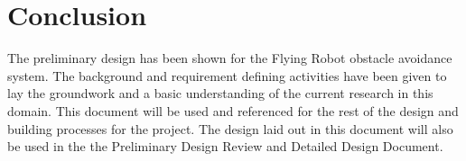 \documentclass{article}
\begin{document}
\section{Conclusion}
The preliminary design has been shown for the Flying Robot obstacle avoidance system. The background and requirement defining activities have been given to lay the groundwork and a basic understanding of the current research in this domain. This document will be used and referenced for the rest of the design and building processes for the project. The design laid out in this document will also be used in the the Preliminary Design Review and Detailed Design Document. 

\printbibliography

\end{document}
